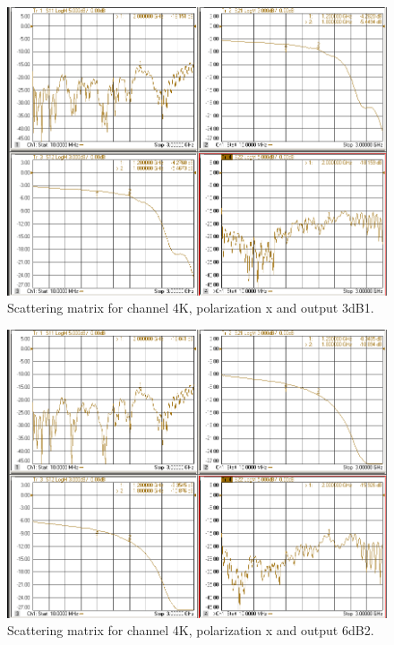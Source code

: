 \documentclass[12pt,a4paper,oneside]{article}
\begin{document}
\begin{figure}[H]
\centering
\includegraphics[width=0.9\linewidth]{VNA_results/4Kx_3dB1.png}
\caption{Scattering matrix for channel 4K, polarization x and output 3dB1.}
\label{fig:4Kx_3dB1}
\end{figure}


\begin{figure}[H]
\centering
\includegraphics[width=0.9\linewidth]{VNA_results/4Kx_6dB2.png}
\caption{Scattering matrix for channel 4K, polarization x and output 6dB2.}
\label{fig:4Kx_6dB2}
\end{figure}
\end{document}
